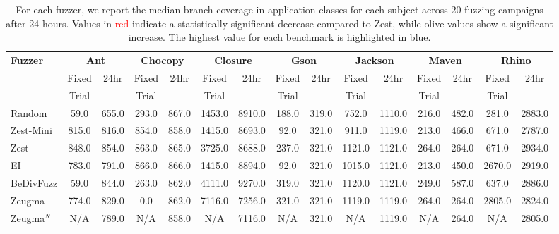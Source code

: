 \begin{table}[t]
    \centering
    \scriptsize
    \setlength{\tabcolsep}{3pt}
    \caption{For each fuzzer, we report the median branch coverage in application classes for each subject across 20 fuzzing campaigns after 24 hours. Values in \textcolor{red}{red} indicate a statistically significant decrease compared to Zest, while \textcolor{\chigher}{olive} values show a significant increase. The highest value for each benchmark is highlighted in blue.}
    \label{tab:cov}
    \begin{tabular}{l|cc|cc|cc|cc|cc|cc|cc}
    \toprule
    \multirow{3}{*}{\textbf{Fuzzer}} & \multicolumn{2}{c|}{\textbf{Ant}} & \multicolumn{2}{c|}{\textbf{Chocopy}} & \multicolumn{2}{c|}{\textbf{Closure}} & \multicolumn{2}{c|}{\textbf{Gson}} & \multicolumn{2}{c|}{\textbf{Jackson}} & \multicolumn{2}{c|}{\textbf{Maven}} & \multicolumn{2}{c}{\textbf{Rhino}}\\
    & Fixed & \multirow{2}{*}{24hr} & Fixed & \multirow{2}{*}{24hr} & Fixed & \multirow{2}{*}{24hr} & Fixed & \multirow{2}{*}{24hr} & Fixed & \multirow{2}{*}{24hr} & Fixed & \multirow{2}{*}{24hr} & Fixed & \multirow{2}{*}{24hr} \\
    & Trial & & Trial & & Trial & & Trial & & Trial & & Trial & & Trial & \\
    \midrule
    Random & 59.0 & 655.0 & 293.0 & \cellcolor{blue!15}867.0 & 1453.0 & 8910.0 & 188.0 & 319.0 & 752.0 & 1110.0 & 216.0 & 482.0 & 281.0 & 2883.0 \\
    Zest-Mini & 815.0 & 816.0 & 854.0 & 858.0 & 1415.0 & 8693.0 & 92.0 & \cellcolor{blue!15}321.0 & 911.0 & 1119.0 & 213.0 & 466.0 & 671.0 & 2787.0 \\
    Zest & \cellcolor{blue!15}848.0 & \cellcolor{blue!15}854.0 & 863.0 & 865.0 & 3725.0 & 8688.0 & 237.0 & \cellcolor{blue!15}321.0 & \cellcolor{blue!15}1121.0 & \cellcolor{blue!15}1121.0 & \cellcolor{blue!15}264.0 & 264.0 & 671.0 & \cellcolor{blue!15}2934.0 \\
    EI & 783.0 & 791.0 & \cellcolor{blue!15}866.0 & 866.0 & 1415.0 & 8894.0 & 92.0 & \cellcolor{blue!15}321.0 & 1015.0 & \cellcolor{blue!15}1121.0 & 213.0 & 450.0 & 2670.0 & 2919.0 \\
    BeDivFuzz & 59.0 & 844.0 & 263.0 & 862.0 & 4111.0 & \cellcolor{blue!15}9270.0 & 319.0 & \cellcolor{blue!15}321.0 & 1120.0 & \cellcolor{blue!15}1121.0 & 249.0 & \cellcolor{blue!15}587.0 & 637.0 & 2886.0 \\
    Zeugma & 774.0 & 829.0 & 0.0 & 862.0 & \cellcolor{blue!15}7116.0 & 7256.0 & \cellcolor{blue!15}321.0 & \cellcolor{blue!15}321.0 & 1119.0 & 1119.0 & \cellcolor{blue!15}264.0 & 264.0 & \cellcolor{blue!15}2805.0 & 2824.0 \\
    Zeugma$^{N}$ & N/A & 789.0 & N/A & 858.0 & N/A & 7116.0 & N/A & 321.0 & N/A & 1119.0 & N/A & 264.0 & N/A & 2805.0 \\
    \bottomrule
    \end{tabular}
\end{table}